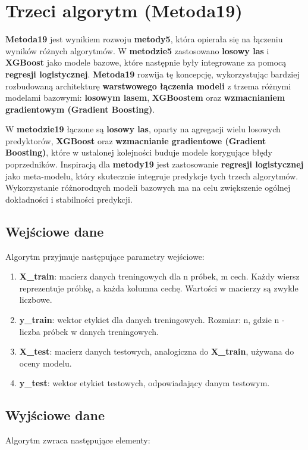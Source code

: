 \section{Trzeci algorytm (\textbf{Metoda19})}
\label{metoda19_section}
\textbf{Metoda19} jest wynikiem rozwoju \textbf{metody5}, która opierała się na łączeniu wyników różnych algorytmów. W \textbf{metodzie5} zastosowano \textbf{losowy las} i \textbf{XGBoost} jako modele bazowe, które następnie były integrowane za pomocą \textbf{regresji logistycznej}. \textbf{Metoda19} rozwija tę koncepcję, wykorzystując bardziej rozbudowaną architekturę \textbf{warstwowego łączenia modeli} z trzema różnymi modelami bazowymi: \textbf{losowym lasem}, \textbf{XGBoostem} oraz \textbf{wzmacnianiem gradientowym (Gradient Boosting)}.

W \textbf{metodzie19} łączone są \textbf{losowy las}, oparty na agregacji wielu losowych predyktorów, \textbf{XGBoost} oraz \textbf{wzmacnianie gradientowe (Gradient Boosting)}, które w ustalonej kolejności buduje modele korygujące błędy poprzedników. Inspiracją dla \textbf{metody19} jest zastosowanie \textbf{regresji logistycznej} jako meta-modelu, który skutecznie integruje predykcje tych trzech algorytmów. Wykorzystanie różnorodnych modeli bazowych ma na celu zwiększenie ogólnej dokładności i stabilności predykcji.

\subsection{Wejściowe dane}
Algorytm przyjmuje następujące parametry wejściowe:

\begin{enumerate}
	\def\labelenumi{\arabic{enumi}.}
	\item
	      \textbf{X\_train}: macierz danych treningowych dla n próbek, m cech. Każdy wiersz reprezentuje próbkę, a każda kolumna cechę. Wartości w macierzy są zwykle liczbowe.
	\item
	      \textbf{y\_train}: wektor etykiet dla danych treningowych. Rozmiar: n, gdzie n - liczba próbek w danych treningowych.
	\item
	      \textbf{X\_test}: macierz danych testowych, analogiczna do \textbf{X\_train}, używana do oceny modelu.
	\item
	      \textbf{y\_test}: wektor etykiet testowych, odpowiadający danym testowym.
\end{enumerate}

\subsection{Wyjściowe dane}
Algorytm zwraca następujące elementy:

